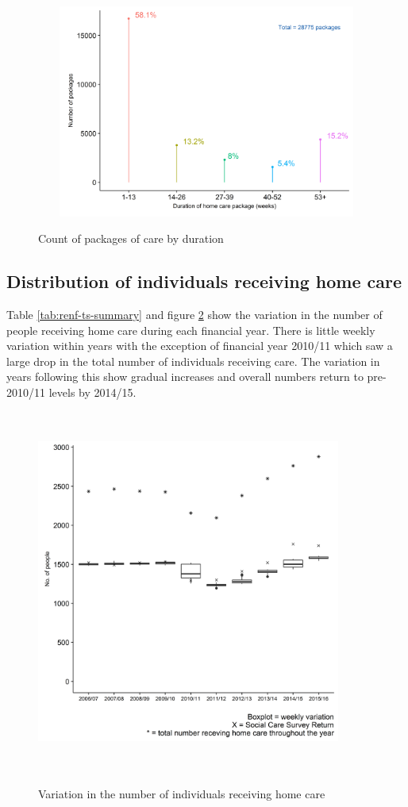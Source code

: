 \documentclass[]{article}
\begin{document}
\begin{figure}[]
  \centering
    \caption{Count of packages of care by duration}
    \includegraphics[height = 7cm, width = 12cm]{figures/chapter-renf/04-duration-plot.png}
    \label{fig:ren-duration}
\end{figure}

\FloatBarrier

\subsection{Distribution of individuals receiving home care}\label{renf-results-ts}

Table \ref{tab:renf-ts-summary} and figure \ref{fig:renf-hrs} show the
variation in the number of people receiving home care during each
financial year. There is little weekly variation within years with the
exception of financial year 2010/11 which saw a large drop in the total
number of individuals receiving care. The variation in years following
this show gradual increases and overall numbers return to pre-2010/11
levels by 2014/15.

\begin{figure}[]
  \centering
    \caption{Variation in the number of individuals receiving home care}
    \includegraphics[width = 10cm, height = 12cm]{figures/chapter-renf/05-indivdual-weekly-variation.png}
    \label{fig:renf-hrs}
\end{figure}
\end{document}
